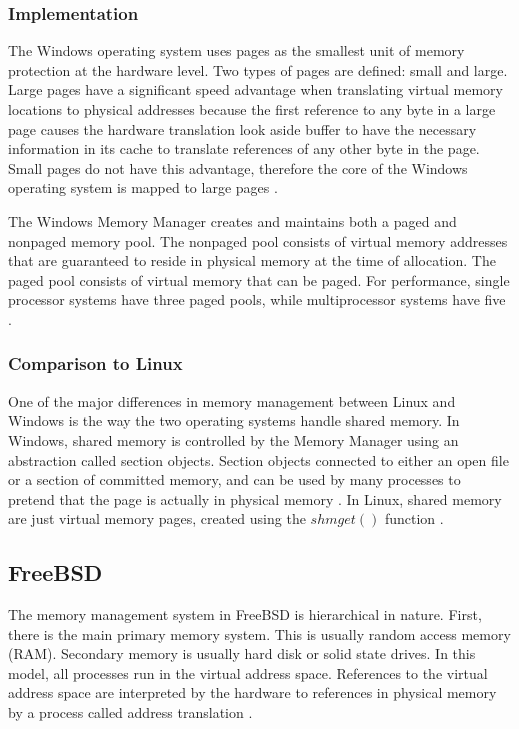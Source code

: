 \documentclass[letterpaper,draftclsnofoot,10pt,onecolumn,titlepage]{IEEEtran}\usepackage[margin=0.75in]{geometry}
\begin{document}
        \subsubsection{Implementation}
            The Windows operating system uses pages as the smallest unit of memory protection at the hardware level.
            Two types of pages are defined: small and large. Large pages have a significant speed advantage when 
            translating virtual memory locations to physical addresses because the first reference to any byte in a 
            large page causes the hardware translation look aside buffer to have the necessary information in its 
            cache to translate references of any other byte in the page. Small pages do not have this advantage,
            therefore the core of the Windows operating system is mapped to large pages \cite{windows}.

            The Windows Memory Manager creates and maintains both a paged and nonpaged memory pool. The nonpaged 
            pool consists of virtual memory addresses that are guaranteed to reside in physical memory at the 
            time of allocation. The paged pool consists of virtual memory that can be paged. For performance,
            single processor systems have three paged pools, while multiprocessor systems have five \cite{windows}.

        \subsubsection{Comparison to Linux}
        One of the major differences in memory management between Linux and Windows is the way the two 
        operating systems handle shared memory. In Windows, shared memory is controlled by the Memory Manager
        using an abstraction called section objects. Section objects connected to either an open file or a 
        section of committed memory, and can be used by many processes to pretend that the page is actually
        in physical memory \cite{windows}. In Linux, shared memory are just virtual memory pages, created 
        using the $shmget()$ function \cite{linux}.

    \subsection{FreeBSD}
    The memory management system in FreeBSD is hierarchical in nature. First, there is the main primary memory system.
    This is usually random access memory (RAM). Secondary memory is usually hard disk or solid state drives. In 
    this model, all processes run in the virtual address space. References to the virtual address space are 
    interpreted by the hardware to references in physical memory by a process called address translation \cite{freebsd}.
\end{document}

